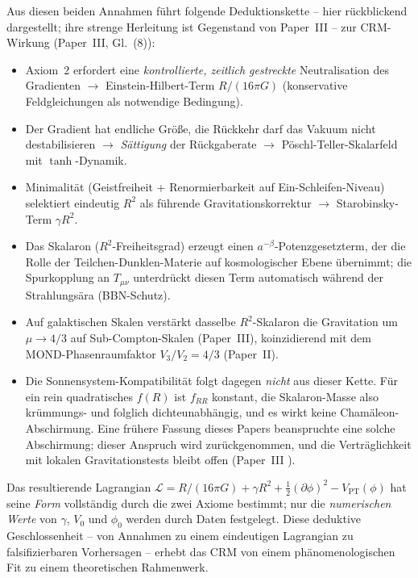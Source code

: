\documentclass[aps,prd,twocolumn,superscriptaddress,nofootinbib]{revtex4-2}
\begin{document}
Aus diesen beiden Annahmen führt folgende Deduktionskette -- hier rückblickend dargestellt; ihre strenge Herleitung ist Gegenstand von Paper~III -- zur CRM-Wirkung (Paper~III, Gl.~(8)):
\begin{itemize}
\item Axiom~2 erfordert eine \textit{kontrollierte, zeitlich gestreckte} Neutralisation des Gradienten $\to$ Einstein-Hilbert-Term $R/(16\pi G)$ (konservative Feldgleichungen als notwendige Bedingung).
\item Der Gradient hat endliche Größe, die Rückkehr darf das Vakuum nicht destabilisieren $\to$ \textit{Sättigung} der Rückgaberate $\to$ Pöschl-Teller-Skalarfeld mit $\tanh$-Dynamik.
\item Minimalität (Geistfreiheit + Renormierbarkeit auf Ein-Schleifen-Niveau) selektiert eindeutig $R^2$ als führende Gravitationskorrektur $\to$ Starobinsky-Term $\gamma R^2$.
\item Das Skalaron ($R^2$-Freiheitsgrad) erzeugt einen $a^{-\beta}$-Potenzgesetzterm, der die Rolle der Teilchen-Dunklen-Materie auf kosmologischer Ebene übernimmt; die Spurkopplung an $T_{\mu\nu}$ unterdrückt diesen Term automatisch während der Strahlungsära (BBN-Schutz).
\item Auf galaktischen Skalen verstärkt dasselbe $R^2$-Skalaron die Gravitation um $\mu \to 4/3$ auf Sub-Compton-Skalen (Paper~III), koinzidierend mit dem MOND-Phasenraumfaktor $V_3/V_2 = 4/3$ (Paper~II).
\item Die Sonnensystem-Kompatibilität folgt dagegen \textit{nicht} aus dieser Kette. Für ein rein quadratisches $f(R)$ ist $f_{RR}$ konstant, die Skalaron-Masse also krümmungs- und folglich dichteunabhängig, und es wirkt keine Chamäleon-Abschirmung. Eine frühere Fassung dieses Papers beanspruchte eine solche Abschirmung; dieser Anspruch wird zurückgenommen, und die Verträglichkeit mit lokalen Gravitationstests bleibt offen (Paper~III \cite{Geiger2026c}).
\end{itemize}

Das resultierende Lagrangian $\mathcal{L} = R/(16\pi G) + \gamma R^2 + \frac{1}{2}(\partial\phi)^2 - V_{\mathrm{PT}}(\phi)$ hat seine \textit{Form} vollständig durch die zwei Axiome bestimmt; nur die \textit{numerischen Werte} von $\gamma$, $V_0$ und $\phi_0$ werden durch Daten festgelegt. Diese deduktive Geschlossenheit -- von Annahmen zu einem eindeutigen Lagrangian zu falsifizierbaren Vorhersagen -- erhebt das CRM von einem phänomenologischen Fit zu einem theoretischen Rahmenwerk.
\end{document}
